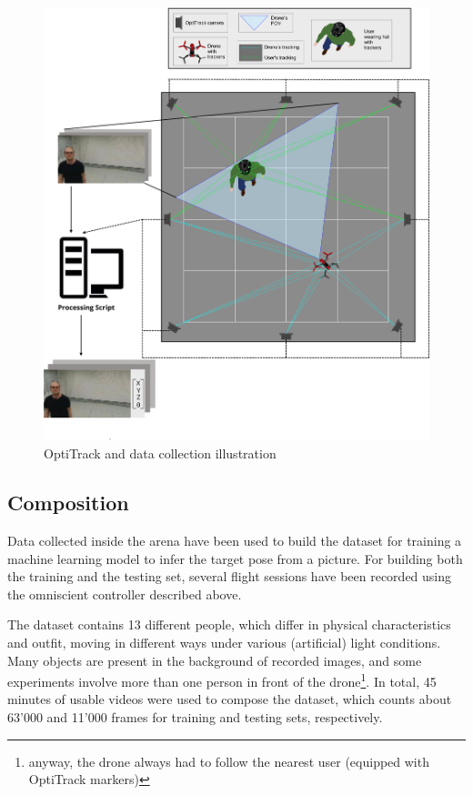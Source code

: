 \begin{figure}[!htb]
	\centering
	\includegraphics[width=1\textwidth]{"contents/images/03-arena-demo-2"}
	\caption[OptiTrack and data collection illustration]{OptiTrack and data collection illustration \cite{mantegazza2018thesis}}
	\label{fig:drone-demo-2}
\end{figure}



\subsection{Composition}
\label{subsec:dataset-composition}

Data collected inside the arena have been used to build the dataset for training a machine learning model to infer the target pose from a picture. For building both the training and the testing set, several flight sessions have been recorded using the omniscient controller described above. 

The dataset contains 13 different people, which differ in physical characteristics and outfit, moving in different ways under various (artificial) light conditions. Many objects are present in the background of recorded images, and some experiments involve more than one person in front of the drone\footnote{anyway, the drone always had to follow the nearest user (equipped with OptiTrack markers)}. In total, 45 minutes of usable videos were used to compose the dataset, which counts about 63'000 and 11'000 frames for training and testing sets, respectively.


